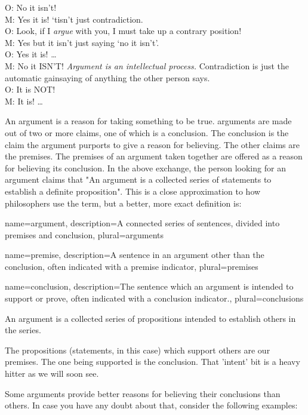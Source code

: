 {\begin{multicols}{2}
O: No it isn't!\\
M: Yes it is! ‘tisn't just contradiction.\\
O: Look, if I \emph{argue} with you, I must take up a contrary position!\\
M: Yes but it isn't just saying ‘no it isn't'.\\
O: Yes it is!
\ldots\\
M: No it ISN'T! \emph{Argument is an intellectual process.} Contradiction is just the automatic gainsaying of anything the other person says.\\
O: It is NOT!\\
M: It is!
\ldots 
\end{multicols}}

An argument is a reason for taking something to be true. \Glspl{argument} are made out of two or more claims, one of which is a \gls{conclusion}. The conclusion is the claim the argument purports to give a reason for believing. The other claims are the \glspl{premise}. The premises of an argument taken together are offered as a reason for believing its conclusion. In the above exchange, the person looking for an argument claims that "An argument is a collected series of statements to establish a definite proposition". This is a close approximation to how philosophers use the term, but a better, more exact definition is:


{
name=argument,
description={A connected series of sentences, divided into \gls{premise}s and \gls{conclusion}},
plural=arguments
}

{
name=premise,
description={A sentence in an \gls{argument} other than the \gls{conclusion}, often indicated with a premise indicator},
plural=premises
}

{
name=conclusion,
description={The sentence which an argument is intended to support or prove, often indicated with a conclusion indicator.},
plural=conclusions
}

\begin{center}
An argument is a collected series of propositions intended to establish others in the series.
\end{center}
The propositions (statements, in this case) which support others are our premises. The one being supported is the conclusion. That 'intent' bit is a heavy hitter as we will soon see.

Some arguments provide better reasons for believing their conclusions than others. In case you have any doubt about that, consider the following examples:

